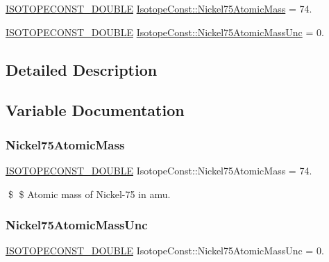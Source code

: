 \begin{DoxyCompactItemize}
\item 
\mbox{\hyperlink{group___isotope_const-_macros_ga8f45a7272ce02c0b4c65c44636ed719a}{I\+S\+O\+T\+O\+P\+E\+C\+O\+N\+S\+T\+\_\+\+D\+O\+U\+B\+LE}} \mbox{\hyperlink{group___isotope_const-_nickel-_ni75_ga298a70e874708b7cdb5321552a894865}{Isotope\+Const\+::\+Nickel75\+Atomic\+Mass}} = 74.
\item 
\mbox{\hyperlink{group___isotope_const-_macros_ga8f45a7272ce02c0b4c65c44636ed719a}{I\+S\+O\+T\+O\+P\+E\+C\+O\+N\+S\+T\+\_\+\+D\+O\+U\+B\+LE}} \mbox{\hyperlink{group___isotope_const-_nickel-_ni75_ga23a12ce3f9963427d32a1c2438fa12c2}{Isotope\+Const\+::\+Nickel75\+Atomic\+Mass\+Unc}} = 0.
\end{DoxyCompactItemize}


\subsection{Detailed Description}


\subsection{Variable Documentation}
\mbox{\label{group___isotope_const-_nickel-_ni75_ga298a70e874708b7cdb5321552a894865}} 
\subsubsection{\texorpdfstring{Nickel75\+Atomic\+Mass}{Nickel75AtomicMass}}
{\footnotesize\ttfamily \mbox{\hyperlink{group___isotope_const-_macros_ga8f45a7272ce02c0b4c65c44636ed719a}{I\+S\+O\+T\+O\+P\+E\+C\+O\+N\+S\+T\+\_\+\+D\+O\+U\+B\+LE}} Isotope\+Const\+::\+Nickel75\+Atomic\+Mass = 74.}

\$ \$ Atomic mass of Nickel-\/75 in amu. \mbox{\label{group___isotope_const-_nickel-_ni75_ga23a12ce3f9963427d32a1c2438fa12c2}} 
\subsubsection{\texorpdfstring{Nickel75\+Atomic\+Mass\+Unc}{Nickel75AtomicMassUnc}}
{\footnotesize\ttfamily \mbox{\hyperlink{group___isotope_const-_macros_ga8f45a7272ce02c0b4c65c44636ed719a}{I\+S\+O\+T\+O\+P\+E\+C\+O\+N\+S\+T\+\_\+\+D\+O\+U\+B\+LE}} Isotope\+Const\+::\+Nickel75\+Atomic\+Mass\+Unc = 0.}

